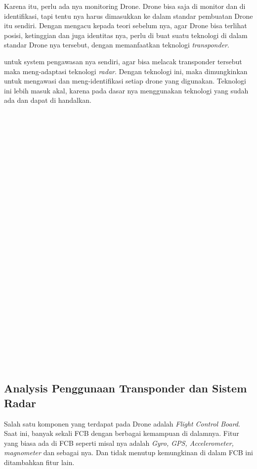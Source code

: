 \documentclass[9pt,twocolumn,twoside]{Gunadarma}
\begin{document}
Karena itu, perlu ada nya monitoring Drone. Drone bisa saja di monitor dan di identifikasi, tapi tentu nya harus dimasukkan ke dalam standar pembuatan Drone itu sendiri. Dengan mengacu kepada teori sebelum nya, agar Drone bisa terlihat posisi, ketinggian dan juga identitas nya, perlu di buat suatu teknologi di dalam standar Drone nya tersebut, dengan memanfaatkan teknologi \textit{transponder}. 

untuk system pengawasan nya sendiri, agar bisa melacak transponder tersebut maka meng-adaptasi teknologi \textit{radar}. Dengan teknologi ini, maka dimungkinkan untuk mengawasi dan meng-identifikasi setiap drone yang digunakan. Teknologi ini lebih masuk akal, karena pada dasar nya menggunakan teknologi yang sudah ada dan dapat di handalkan. 
\\ \\ \\ \\ \\ \\ \\ \\ \\ \\ \\ \\ \\ \\ \\ \\
\\ \\ \\ \\ \\ \\ \\ \\ \\ \\ \\ \\ 

\subsection{Analysis Penggunaan Transponder dan Sistem Radar}

Salah satu komponen yang terdapat pada Drone adalah \textit{Flight Control Board}. Saat ini, banyak sekali FCB dengan berbagai kemampuan di dalamnya. Fitur yang biasa ada di FCB seperti misal nya adalah \textit{Gyro, GPS, Accelerometer, magnometer} dan sebagai nya. Dan tidak menutup kemungkinan di dalam FCB ini ditambahkan fitur lain.
\end{document}
